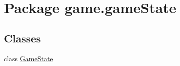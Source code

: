 \hypertarget{namespacegame_1_1game_state}{}\section{Package game.\+game\+State}
\label{namespacegame_1_1game_state}
\subsection*{Classes}
\begin{DoxyCompactItemize}
\item 
class \mbox{\hyperlink{classgame_1_1game_state_1_1_game_state}{Game\+State}}
\end{DoxyCompactItemize}
